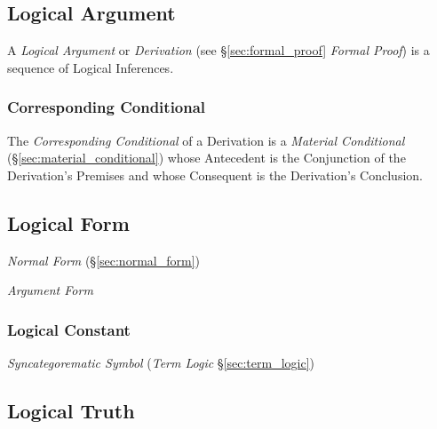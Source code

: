 \subsection{Logical Argument}\label{sec:logical_argument}

A \emph{Logical Argument} or \emph{Derivation} (see
\S\ref{sec:formal_proof} \emph{Formal Proof}) is a sequence of Logical
Inferences.



\subsubsection{Corresponding Conditional}\label{sec:corresponding_conditional}

The \emph{Corresponding Conditional} of a Derivation is a
\emph{Material Conditional} (\S\ref{sec:material_conditional}) whose
Antecedent is the Conjunction of the Derivation's Premises and whose
Consequent is the Derivation's Conclusion.



\subsection{Logical Form}\label{sec:logical_form}

\emph{Normal Form} (\S\ref{sec:normal_form})

\emph{Argument Form}



\subsubsection{Logical Constant}\label{sec:logical_constant}

\emph{Syncategorematic Symbol} (\emph{Term Logic} \S\ref{sec:term_logic})



\subsection{Logical Truth}\label{sec:logical_truth}

